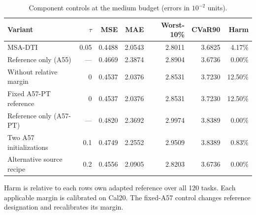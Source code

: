 \begin{table}[pos=!htbp]
\centering\footnotesize
\caption{Component controls at the medium budget (errors in $10^{-2}$ units).}\label{tab:ablation}
\begin{tabular}{lrrrrrr}
\toprule
Variant & $\tau$ & MSE & MAE & Worst-10\% & CVaR90 & Harm\\\midrule
MSA-DTI & 0.05 & 0.4488 & 2.0543 & 2.8011 & 3.6825 & 4.17\%\\
Reference only (A55) & --- & 0.4669 & 2.3874 & 2.8904 & 3.6736 & 0.00\%\\
Without relative margin & 0 & 0.4537 & 2.0376 & 2.8531 & 3.7230 & 12.50\%\\
Fixed A57-PT reference & 0 & 0.4537 & 2.0376 & 2.8531 & 3.7230 & 12.50\%\\
Reference only (A57-PT) & --- & 0.4820 & 2.3692 & 2.9974 & 3.8389 & 0.00\%\\
Two A57 initializations & 0.1 & 0.4749 & 2.2552 & 2.9509 & 3.8389 & 0.83\%\\
Alternative source recipe & 0.2 & 0.4556 & 2.0905 & 2.8203 & 3.6736 & 0.00\%\\
\bottomrule
\end{tabular}
\par\vspace{3pt}\begin{minipage}{\linewidth}\footnotesize Harm is relative to each row\textquotesingle s own adapted reference over all 120 tasks. Each applicable margin is calibrated on Cal20. The fixed-A57 control changes reference designation and recalibrates its margin.\end{minipage}
\end{table}
